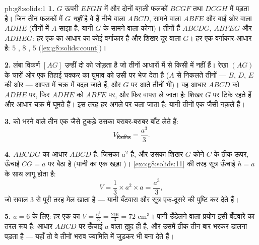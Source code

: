 \begin{solution}{pb:g8:solids:1}
\textbf{1.} $G$ ऊपरी  $EFGH$ में और दोनों बग़ली फलकों $BCGF$
तथा $DCGH$ में पड़ता है। जिन तीन फलकों में $G$ \emph{नहीं} है वे हैं
नीचे वाला $ABCD$, सामने वाला $ABFE$ और बाईं ओर वाला $ADHE$ (तीनों
में  $A$ साझा है, यानी $G$ के सामने वाला कोना)। तीनों 
हैं $ABCDG$, $ABFEG$ और $ADHEG$: हर एक का आधार  का कोई वर्गाकार
 है और शिखर दूर वाला  $G$। हर एक वर्गाकार-आधार  है:
$5$ , $8$ , $5$  (\cref{ex:g8:solids:count})।

\textbf{2.} लंबा विकर्ण $[AG]$ उन्हीं दो  को जोड़ता है जो
तीनों आधारों में से किसी में नहीं हैं। रेखा $(AG)$ के चारों ओर एक
तिहाई चक्कर का घुमाव  को उसी पर भेज देता है ($A$ से निकलते तीनों
 --- $B$, $D$, $E$ की ओर --- आपस में चक्र में बदल जाते हैं,
और $G$ पर आते तीनों  भी)। वह आधार $ABCD$ को $ADHE$ पर, फिर
$ADHE$ को $ABFE$ पर, और फिर वापस ले जाता है: शिखर $G$ पर टिके रहते
हैं और आधार चक्र में घूमते हैं। इस तरह हर  अगले पर चला जाता
है: यानी तीनों एक जैसी नक़लें हैं।

\textbf{3.}  को भरने वाले तीन एक जैसे टुकड़े उसका  बराबर-बराबर
बाँट लेते हैं:
\[
V_{\text{पिरामिड}} = \frac{a^3}{3} .
\]

\textbf{4.}  $ABCDG$ का आधार $ABCD$ है, जिसका 
$a^2$ है, और उसका शिखर $G$ कोने $C$ के ठीक ऊपर, ऊँचाई $CG = a$ पर
बैठा है (यानी  का एक खड़ा )। \cref{exo:g8:solids:11} की तरह
सूत्र  ऊँचाई $h = a$ के साथ लागू होता है:
\[
V = \frac13 \times a^2 \times a = \frac{a^3}{3} ,
\]
जो सवाल 3 से पूरी तरह मेल खाता है --- यानी बँटवारा और सूत्र एक-दूसरे
की पुष्टि कर देते हैं।

\textbf{5.} $a = 6$ के लिए:
हर एक का $V = \frac{6^3}{3} = \frac{216}{3} = 72$ cm$^3$। पानी
उँडेलने वाला प्रयोग इसी बँटवारे का तरल रूप है: आधार $ABCD$ पर
ऊँचाई $a$ वाला  ख़ुद  ही है, और उसमें ठीक तीन बार 
भरकर डालना पड़ता है --- यहाँ तो वे तीनों भराव ज्यामिति में जुड़कर 
भी बना देते हैं।


\end{solution}
